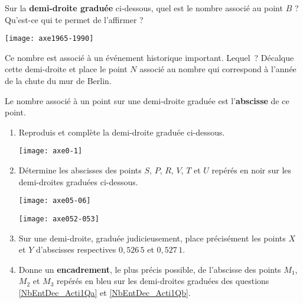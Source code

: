 \begin{activite}

\begin{partie}
Sur la \textbf{demi-droite graduée} ci-dessous, quel est le nombre associé au point $B$ ? Qu'est-ce qui te permet de l'affirmer ?

\texttt{[image: axe1965-1990]}

Ce nombre est associé à un événement historique important. Lequel ?
Décalque cette demi-droite et place le point $N$ associé au nombre qui correspond à l'année de la chute du mur de Berlin.

Le nombre associé à un point sur une demi-droite graduée est l'\textbf{abscisse} de ce point.

\end{partie}

\begin{partie}
\begin{enumerate}
 \item Reproduis et complète la demi-droite graduée ci-dessous. \label{NbEntDec_Acti1Qa}
 
 \texttt{[image: axe0-1]}
 
 \item Détermine les abscisses des points $S$, $P$, $R$, $V$, $T$ et $U$ repérés en noir sur les demi-droites graduées ci-dessous.\label{NbEntDec_Acti1Qb}
 
\texttt{[image: axe05-06]}

\texttt{[image: axe052-053]}
 
 \item Sur une demi-droite, graduée judicieusement, place précisément les points $X$ et $Y$ d'abscisses respectives $0,526\,5$ et $0,527\,1$.
 \item Donne un \textbf{encadrement}, le plus précis possible, de l'abscisse des points $M_1$, $M_2$ et $M_3$ repérés en bleu sur les demi-droites graduées des questions \ref{NbEntDec_Acti1Qa} et \ref{NbEntDec_Acti1Qb}.
 \end{enumerate}
\end{partie}

\end{activite}





